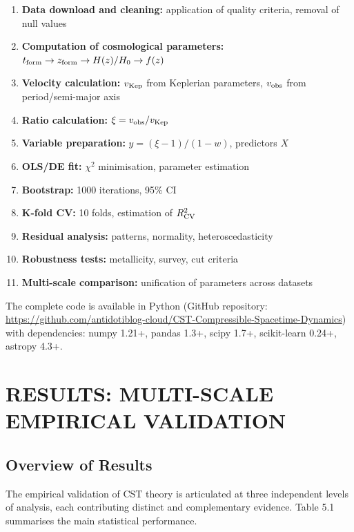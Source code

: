 \documentclass[11pt,a4paper]{article}
\providecommand{\tightlist}{\setlength{\itemsep}{0pt}\setlength{\parskip}{0pt}}
\begin{document}
\begin{enumerate}
\def\labelenumi{\arabic{enumi}.}
\tightlist
\item
  \textbf{Data download and cleaning:} application of quality criteria,
  removal of null values
\item
  \textbf{Computation of cosmological parameters:}
  \(t_{\rm form} \to z_{\rm form} \to H(z)/H_0 \to f(z)\)
\item
  \textbf{Velocity calculation:} \(v_{\rm Kep}\) from Keplerian
  parameters, \(v_{\rm obs}\) from period/semi-major axis
\item
  \textbf{Ratio calculation:} \(\xi = v_{\rm obs}/v_{\rm Kep}\)
\item
  \textbf{Variable preparation:} \(y = (\xi-1)/(1-w)\), predictors \(X\)
\item
  \textbf{OLS/DE fit:} \(\chi^2\) minimisation, parameter estimation
\item
  \textbf{Bootstrap:} 1000 iterations, 95\% CI
\item
  \textbf{K-fold CV:} 10 folds, estimation of \(R^2_{\rm CV}\)
\item
  \textbf{Residual analysis:} patterns, normality, heteroscedasticity
\item
  \textbf{Robustness tests:} metallicity, survey, cut criteria
\item
  \textbf{Multi-scale comparison:} unification of parameters across
  datasets
\end{enumerate}

The complete code is available in Python (GitHub repository:
\url{https://github.com/antidotiblog-cloud/CST-Compressible-Spacetime-Dynamics})
with dependencies: numpy 1.21+, pandas 1.3+, scipy 1.7+, scikit-learn
0.24+, astropy 4.3+.

\hypertarget{results-multi-scale-empirical-validation}{%
\section{RESULTS: MULTI-SCALE EMPIRICAL
VALIDATION}\label{results-multi-scale-empirical-validation}}

\hypertarget{overview-of-results}{%
\subsection{Overview of Results}\label{overview-of-results}}

The empirical validation of CST theory is articulated at three
independent levels of analysis, each contributing distinct and
complementary evidence. Table 5.1 summarises the main statistical
performance.
\end{document}

